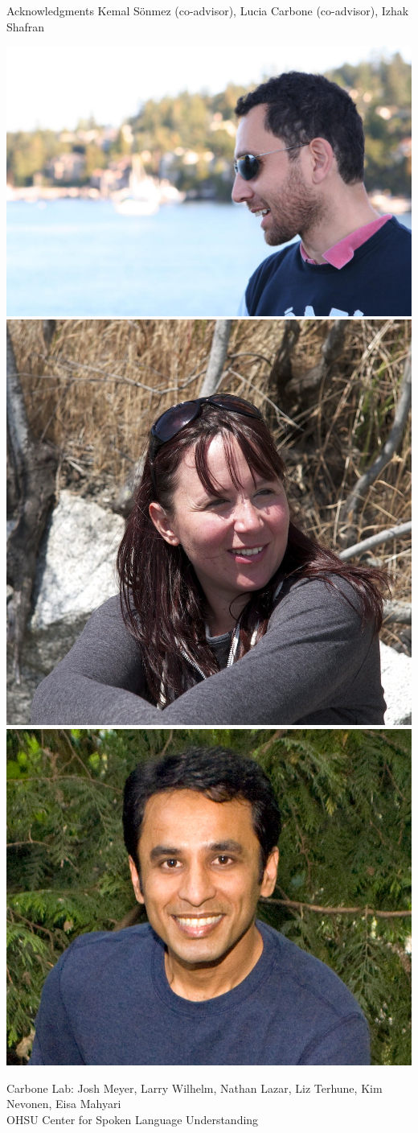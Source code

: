 \documentclass{beamer}
\begin{document}
\begin{frame}{Acknowledgments}
  Kemal S\"onmez (co-advisor), Lucia Carbone (co-advisor), Izhak Shafran
 \begin{center}
   \includegraphics[width=.2\textwidth]{kemal3.jpg} \hspace{20 mm}   
   \includegraphics[width=.2\textwidth]{Lucia_Profile.jpg} \hspace{20 mm}
   \includegraphics[width=.2\textwidth]{izhak_shafran.jpg}
  \end{center}
  Carbone Lab: Josh Meyer, Larry Wilhelm, Nathan Lazar, Liz Terhune, Kim Nevonen, Eisa Mahyari \\
\vspace{10 mm}
  OHSU Center for Spoken Language Understanding
\end{frame}

\appendix
{}
\setcounter{finalframe}{\value{framenumber}}
\end{document}

